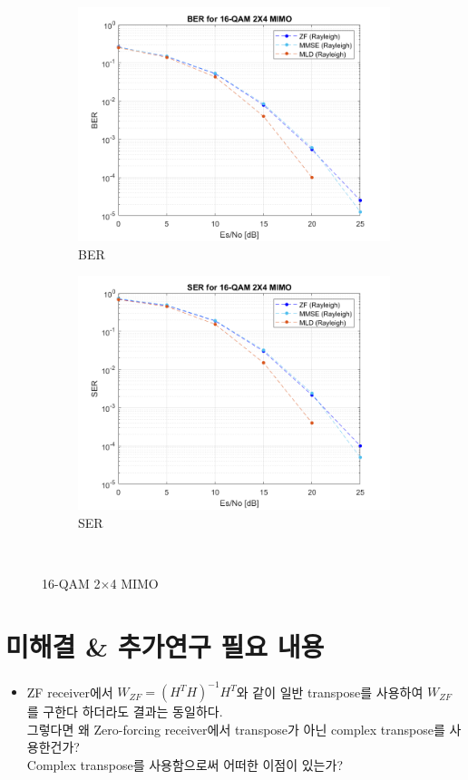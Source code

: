 \documentclass{article}
\begin{document}
\begin{figure}[H]
	\centering
	\begin{subfigure}{0.5\textwidth}
		\centerline{\includegraphics[width=1\textwidth]{f_Es_BER.png}}
		\caption{BER}
	\end{subfigure}%
	\begin{subfigure}{0.5\textwidth}
		\centerline{\includegraphics[width=1\textwidth]{f_Es_SER.png}}
		\caption{SER}
	\end{subfigure}\\%
	\caption{16-QAM 2$\times$4 MIMO}
\end{figure}
\section{미해결 \& 추가연구 필요 내용}
\begin{itemize}
  \item ZF receiver에서 $W_{ZF}=(H^T H)^{-1}H^T$와 같이 일반 transpose를 사용하여 $W_{ZF}$를 구한다 하더라도 결과는 동일하다.\\그렇다면 왜 Zero-forcing receiver에서 transpose가 아닌 complex transpose를 사용한건가?\\Complex transpose를 사용함으로써 어떠한 이점이 있는가?
\end{itemize}
\end{document}

